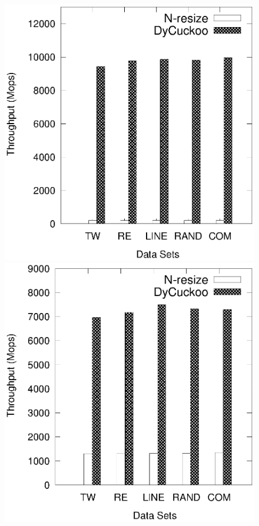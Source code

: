 %
\begin{figure}[t]
	\begin{minipage}{0.48\linewidth}\centering
		\includegraphics[width=\linewidth]{pic/compare/upsize.eps}
		\centerline{}
	\end{minipage}
	\hfill
	\begin{minipage}{0.48\linewidth}\centering
		\includegraphics[width=\linewidth]{pic/compare/downsize.eps}
		\centerline{}
	\end{minipage}
	\caption{}
	\label{fig:resize}
\end{figure}

